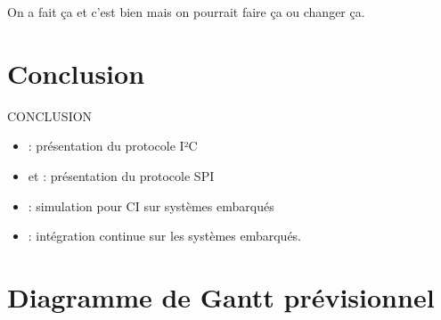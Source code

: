 \documentclass[a4paper]{article}
\begin{document}
On a fait ça et c'est bien mais on pourrait faire ça ou changer ça.

\clearpage
\section*{Conclusion}

CONCLUSION




\begin{itemize}
  \item \cite{mankar2014review}: présentation du protocole I²C
  \item \cite{dhaker2018introduction} et \cite{li2014design}: présentation du
    protocole SPI
  \item \cite{engblom2015continuous}: simulation pour CI sur systèmes embarqués
  \item \cite{maartensson2016continuous}: intégration continue sur les systèmes
    embarqués.
\end{itemize}

\clearpage{}
\pagestyle{empty}
\printbibliography[keyword={paper},title={Biliographie}]
\printbibliography[keyword={web},title={Webographie}]

\clearpage
\printglossaries

\appendix

\clearpage{}
\section{Diagramme de Gantt prévisionnel}\label{appendix:expectedgantt}
\end{document}
